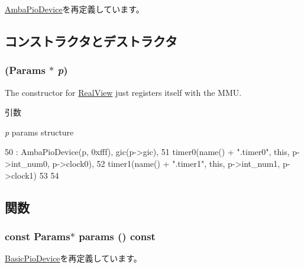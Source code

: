 \hyperlink{classAmbaPioDevice_ab091a3a8ffa1f3152ec35e30d1b384d5}{AmbaPioDevice}を再定義しています。

\subsection{コンストラクタとデストラクタ}
\hypertarget{classSp804_a51a53318988df11f161ff4849813bcdd}{
\subsubsection[{Sp804}]{ ({\bf Params} $\ast$ {\em p})}}
\label{classSp804_a51a53318988df11f161ff4849813bcdd}
The constructor for \hyperlink{classRealView}{RealView} just registers itself with the MMU. 
\begin{DoxyParams}{引数}
\item[{\em p}]params structure \end{DoxyParams}



\begin{DoxyCode}
50     : AmbaPioDevice(p, 0xfff), gic(p->gic),
51       timer0(name() + ".timer0", this, p->int_num0, p->clock0),
52       timer1(name() + ".timer1", this, p->int_num1, p->clock1)
53 {
54 }
\end{DoxyCode}


\subsection{関数}
\hypertarget{classSp804_acd3c3feb78ae7a8f88fe0f110a718dff}{
\subsubsection[{params}]{\setlength{\rightskip}{0pt plus 5cm}const {\bf Params}$\ast$ params () const}}
\label{classSp804_acd3c3feb78ae7a8f88fe0f110a718dff}


\hyperlink{classBasicPioDevice_acd3c3feb78ae7a8f88fe0f110a718dff}{BasicPioDevice}を再定義しています。


